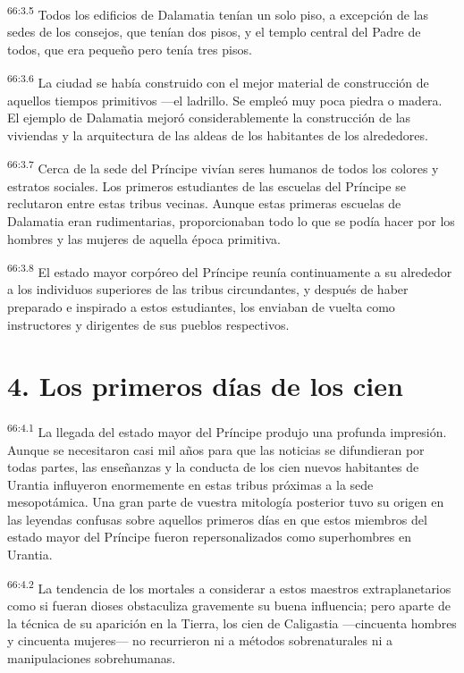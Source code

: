 \par
\textsuperscript{66:3.5} Todos los edificios de Dalamatia tenían un solo piso, a excepción de las sedes de los consejos, que tenían dos pisos, y el templo central del Padre de todos, que era pequeño pero tenía tres pisos.

\par
\textsuperscript{66:3.6} La ciudad se había construido con el mejor material de construcción de aquellos tiempos primitivos ---el ladrillo. Se empleó muy poca piedra o madera. El ejemplo de Dalamatia mejoró considerablemente la construcción de las viviendas y la arquitectura de las aldeas de los habitantes de los alrededores.

\par
\textsuperscript{66:3.7} Cerca de la sede del Príncipe vivían seres humanos de todos los colores y estratos sociales. Los primeros estudiantes de las escuelas del Príncipe se reclutaron entre estas tribus vecinas. Aunque estas primeras escuelas de Dalamatia eran rudimentarias, proporcionaban todo lo que se podía hacer por los hombres y las mujeres de aquella época primitiva.

\par
\textsuperscript{66:3.8} El estado mayor corpóreo del Príncipe reunía continuamente a su alrededor a los individuos superiores de las tribus circundantes, y después de haber preparado e inspirado a estos estudiantes, los enviaban de vuelta como instructores y dirigentes de sus pueblos respectivos.

\section*{4. Los primeros días de los cien}
\par
\textsuperscript{66:4.1} La llegada del estado mayor del Príncipe produjo una profunda impresión. Aunque se necesitaron casi mil años para que las noticias se difundieran por todas partes, las enseñanzas y la conducta de los cien nuevos habitantes de Urantia influyeron enormemente en estas tribus próximas a la sede mesopotámica. Una gran parte de vuestra mitología posterior tuvo su origen en las leyendas confusas sobre aquellos primeros días en que estos miembros del estado mayor del Príncipe fueron repersonalizados como superhombres en Urantia.

\par
\textsuperscript{66:4.2} La tendencia de los mortales a considerar a estos maestros extraplanetarios como si fueran dioses obstaculiza gravemente su buena influencia; pero aparte de la técnica de su aparición en la Tierra, los cien de Caligastia ---cincuenta hombres y cincuenta mujeres--- no recurrieron ni a métodos sobrenaturales ni a manipulaciones sobrehumanas.

